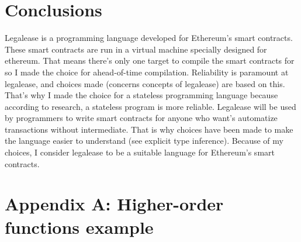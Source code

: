 \documentclass{uva-inf-article}
\begin{document}
\section{Conclusions}
\par Legalease is a programming language developed for Ethereum's smart contracts. 
These smart contracts are run in a virtual machine specially designed for ethereum.
That means there's only one target to compile the smart contracts for so I made the choice for ahead-of-time compilation.
Reliability is paramount at legalease, and choices made (concerns concepts of legalease) are based on this.
That's why I made the choice for a stateless programming language because according to research, a stateless program is more reliable.
Legalease will be used by programmers to write smart contracts for anyone who want's automatize transactions without intermediate.
That is why choices have been made to make the language easier to understand (see explicit type inference).
Because of my choices, I consider legalease to be a suitable language for Ethereum's smart contracts.

\newpage
\printbibliography
\newpage

\newpage
\section{Appendix A: Higher-order functions example}

\end{document}
